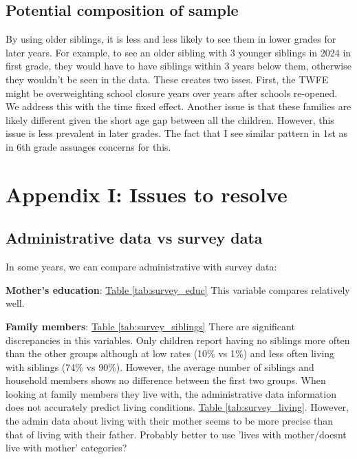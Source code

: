 \subsection{Potential composition of sample}

By using older siblings, it is less and less likely to see them in lower grades for later years. For example, to see an older sibling with 3 younger siblings in 2024 in first grade, they would have to have siblings within 3 years below them, otherwise they wouldn't be seen in the data. These creates two isses. First, the TWFE might be overweighting school closure years over years after schools re-opened. We address this with the time fixed effect. Another issue is that these families are likely different given the short age gap between all the children. However, this issue is less prevalent in later grades. The fact that I see similar pattern in 1st as in 6th grade assuages concerns for this.


\setcounter{figure}{0}
\renewcommand\thefigure{I.\arabic{figure}}    

\setcounter{table}{0}
\renewcommand{\thetable}{I.\arabic{table}}
\setcounter{subsection}{0}

\clearpage

\section*{Appendix I: Issues to resolve} \label{sec:appI}

\subsection{Administrative data vs survey data}

In some years, we can compare administrative with survey data:

\textbf{Mother's education}: \hyperref[tab:survey_educ]{Table \ref{tab:survey_educ}}
This variable compares relatively well. 

\textbf{Family members}: \hyperref[tab:survey_siblings]{Table \ref{tab:survey_siblings}}
There are significant discrepancies in this variables. Only children report having no siblings more often than the other groups although at low rates (10\% vs 1\%) and less often living with siblings (74\% vs 90\%). However, the average number of siblings and household members shows no difference between the first two groups. When looking at family members they live with, the administrative data information does not accurately predict living conditions. \hyperref[tab:survey_living]{Table \ref{tab:survey_living}}. However, the admin data about living with their mother seems to be more precise than that of living with their father. Probably better to use 'lives with mother/doesnt live with mother' categories?

